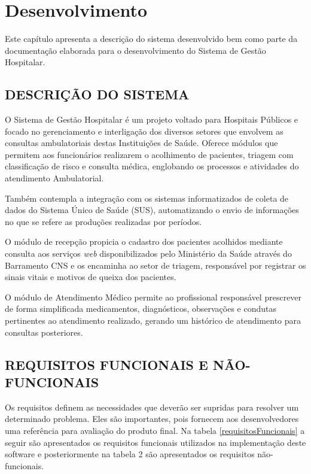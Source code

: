 \chapter{Desenvolvimento}

Este capítulo apresenta a descrição do sistema desenvolvido bem como parte da documentação elaborada para o desenvolvimento do Sistema de Gestão Hospitalar.

\section{DESCRIÇÃO DO SISTEMA}

O Sistema de Gestão Hospitalar é um projeto voltado para Hospitais Públicos e focado no gerenciamento e interligação dos diversos setores que envolvem as consultas ambulatoriais destas Instituições de Saúde.
Oferece módulos que permitem aos funcionários realizarem o acolhimento de pacientes, triagem com classificação de risco e consulta médica, englobando os processos e atividades do atendimento Ambulatorial.

Também contempla a integração com os sistemas informatizados de coleta de dados do Sistema Único de Saúde (SUS), automatizando o envio de informações no que se refere as produções realizadas por períodos.

O módulo de recepção propicia o cadastro dos pacientes acolhidos mediante consulta aos serviços \textit{web} disponibilizados pelo Ministério da Saúde através do Barramento CNS e os encaminha ao setor de triagem, responsável por registrar os sinais vitais e motivos de queixa dos pacientes.

O módulo de Atendimento Médico permite ao profissional responsável prescrever de forma simplificada medicamentos, diagnósticos, observações e condutas pertinentes ao atendimento realizado, gerando um histórico de atendimento para consultas posteriores.



\section{REQUISITOS FUNCIONAIS E NÃO-FUNCIONAIS}

Os requisitos definem as necessidades que deverão ser supridas para resolver um determinado problema. Eles são importantes, pois fornecem aos desenvolvedores uma referência para avaliação do produto final. Na tabela \ref{requisitosFuncionais} a seguir são apresentados os requisitos funcionais utilizados na implementação deste software e posteriormente na tabela 2 são apresentados os requisitos não-funcionais.

